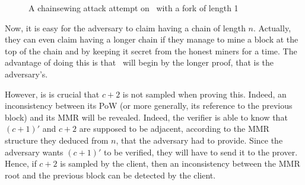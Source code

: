 \documentclass[11pt]{report}
\begin{document}
            \begin{figure}[ht]
                \centering
                    \caption{A chainsewing attack attempt on \FC\ with a fork of length 1}
                    \label{figure:chainsewingattack}
                \end{figure}
                
            Now, it is easy for the adversary to claim having a chain of length \(n\). Actually, they can even claim having a longer chain if they manage to mine a block at the top of the chain and by keeping it secret from the honest miners for a time. The advantage of doing this is that \FC\ will begin by the longer proof, that is the adversary's.
            
            However, is is crucial that \(c+2\) is not sampled when proving this. Indeed, an inconsistency between its PoW (or more generally, its reference to the previous block) and its MMR will be revealed. Indeed, the verifier is able to know that \((c+1)'\) and \(c+2\) are supposed to be adjacent, according to the MMR structure they deduced from \(n\), that the adversary had to provide. Since the adversary wants \((c+1)'\) to be verified, they will have to send it to the prover. Hence, if \(c+2\) is sampled by the client, then an inconsistency between the MMR root and the previous block can be detected by the client.
            
\end{document}
